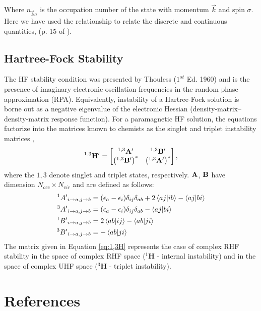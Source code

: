 \documentclass{revtex4}
\begin{document}
    Where $n_{\vec{k}\sigma}$ is the occupation number of the state with momentum $\vec{k}$ and spin $\sigma$. Here we have used the relationship to relate the discrete and continuous quantities, (p. 15 of \cite{Guiliani2005}). 

    \subsection{Hartree-Fock Stability}
    The HF stability condition was presented by Thouless \cite{Thouless1972} ($1^{st}$ Ed. 1960) and is the presence of imaginary electronic oscillation frequencies in the random phase approximation (RPA). Equivalently, instability of a Hartree-Fock solution is borne out as a negative eigenvalue of the electronic Hessian (density-matrix--density-matrix response function). For a paramagnetic HF solution, the equations factorize into the matrices known to chemists as the singlet and triplet instability matrices \cite{Dunning1967}\cite{Seeger1977},
    \begin{equation}\label{eq:1,3H}
    {}^{1,3}\bf{H'}=
    \begin{bmatrix}
    {}^{1,3}\bf{A'} & {}^{1,3}\bf{B'} \\
    \left({}^{1,3}\bf{B'}\right)^* & \left({}^{1,3}\bf{A'}\right)^* \\
    \end{bmatrix},
    \end{equation}
    where the $1,3$ denote singlet and triplet states, respectively. $\bf{A}$, $\bf{B}$ have dimension $N_{occ}\times N_{vir}$ and are defined as follows:
    \begin{subequations}
    	\begin{align}
    	{}^{1}{A'}_{i\rightarrow a, j\rightarrow b} &= (\epsilon_a-\epsilon_i)\delta_{ij}\delta_{ab} + 2\braket{aj|ib}-\braket{aj|bi}\\
    	{}^{3}{A'}_{i\rightarrow a, j\rightarrow b} &= (\epsilon_a-\epsilon_i)\delta_{ij}\delta_{ab} - \braket{aj|bi}\\
    	{}^{1}{B'}_{i\rightarrow a, j\rightarrow b} &= 2\braket{ab|ij}-\braket{ab|ji}\\
    	{}^{3}{B'}_{i\rightarrow a, j\rightarrow b} &= -\braket{ab|ji}
    	\end{align}
    \end{subequations}
    The matrix given in Equation \ref{eq:1,3H} represents the case of complex RHF stability in the space of complex RHF space (${}^{1}\mathbf{H}$ - internal instability) and in the space of complex UHF space (${}^{3}\mathbf{H}$ - triplet instability).

\section{References}

\end{document}
